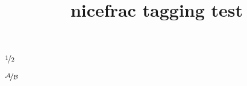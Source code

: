 \documentclass{article}
\title{nicefrac tagging test}
\begin{document}
\bfseries\itshape{}

\bfseries\itshape$\nicefrac{1}{2}$



$\nicefrac[\mathcal]{A}{B}$
\end{document}

